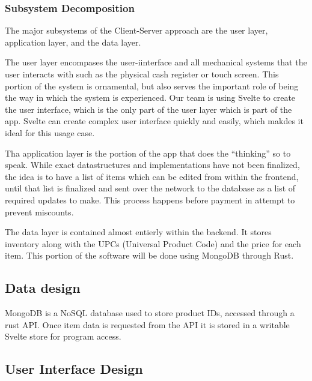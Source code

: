 \subsubsection{Subsystem Decomposition}

The major subsystems of the Client-Server approach are the user layer, application layer,
and the data layer.\par
The user layer encompases the user-iinterface and all mechanical systems that the user interacts with
such as the physical cash register or touch screen. This portion of the system is
ornamental, but also serves the important role of being the way in which the system
is experienced. Our team is using Svelte to create the user interface, which is the only part of the user layer 
which is part of the app. Svelte can create complex user interface quickly and easily,
which makdes it ideal for this usage case.\par
Tha application layer is the portion of the app that does the ``thinking'' so to speak.
While exact datastructures and implementations have not been finalized, the idea is to have
a list of items which can be edited from within the frontend, until that list is finalized and sent
over the network to the database as a list of required updates to make. This process
happens before payment in attempt to prevent miscounts.\par
The data layer is contained almost entierly within the backend. It stores inventory along with the
UPCs (Universal Product Code) and the price for each item. This portion of the software will be done
using MongoDB through Rust.

\subsection{Data design}

MongoDB is a NoSQL database used to store product IDs, accessed through a rust API.
Once item data is requested from the API it is stored in a writable Svelte store for
program access.

\subsection{User Interface Design}


